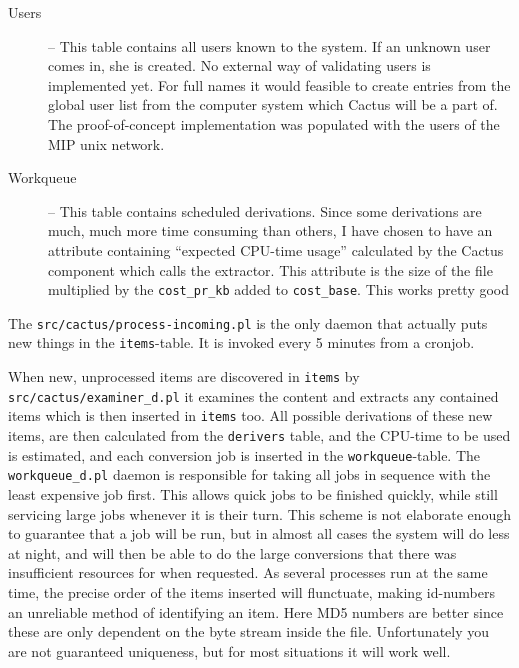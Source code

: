 \begin{description}


\item[Users] -- This table contains all users known to the system.  If
  an unknown user comes in, she is created.  No external way of
  validating users is implemented yet.  For full names it would
  feasible to create entries from the global user list from the
  computer system which Cactus will be a part of.  The
  proof-of-concept implementation was populated with the users of the
  MIP unix network.



\item[Workqueue] -- This table
contains scheduled derivations.  Since some derivations are much, much
more time consuming than others, I have chosen to have an attribute
containing ``expected CPU-time usage'' calculated by the Cactus
component which calls the extractor.  This attribute is the
size of the file multiplied by the \texttt{cost\_pr\_kb} added to
\texttt{cost\_base}. This works pretty good



\end{description}

The \texttt{src/cactus/process-incoming.pl} is the only daemon that
actually puts new things in the \texttt{items}-table.  It is invoked
every 5 minutes from a cronjob.

When new, unprocessed items are discovered in \texttt{items} by
\texttt{src/cactus/examiner\_d.pl} it examines the content and
extracts any contained items which is then inserted in \texttt{items}
too.  All possible derivations of these new items, are then calculated
from the \texttt{derivers} table, and the CPU-time to be used is
estimated, and each conversion job is inserted in the
\texttt{workqueue}-table.  The \texttt{workqueue\_d.pl} daemon is
responsible for taking all jobs in sequence with the least expensive
job first.  This allows quick jobs to be finished quickly, while still
servicing large jobs whenever it is their turn.  This scheme is not
elaborate enough to guarantee that a job will be run, but in almost
all cases the system will do less at night, and will then be able to
do the large conversions that there was insufficient resources for
when requested.  As several processes run at the same time, the
precise order of the items inserted will flunctuate, making id-numbers
an unreliable method of identifying an item.  Here MD5 numbers are
better since these are only dependent  on the byte stream inside the
file.  Unfortunately you are not guaranteed uniqueness, but for most
situations it will work well.

